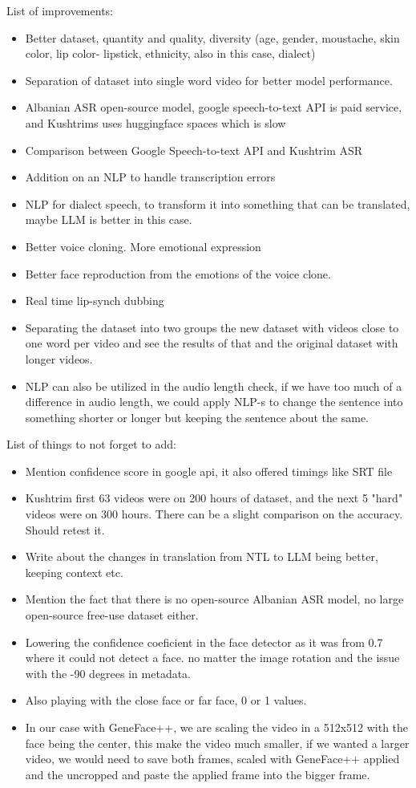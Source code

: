 \documentclass[12pt]{article}
\begin{document}
List of improvements:
\begin{itemize}
    \item Better dataset, quantity and quality, diversity (age, gender, moustache, skin color, lip color- lipstick, ethnicity, also in this case, dialect)
    \item Separation of dataset into single word video for better model performance.
    \item Albanian ASR open-source model, google speech-to-text API is paid service, and Kushtrims uses huggingface spaces which is slow
    \item Comparison between Google Speech-to-text API and Kushtrim ASR
    \item Addition on an NLP to handle transcription errors
    \item NLP for dialect speech, to transform it into something that can be translated, maybe LLM is better in this case.
    \item Better voice cloning. More emotional expression
    \item Better face reproduction from the emotions of the voice clone.
    \item Real time lip-synch dubbing
    \item Separating the dataset into two groups the new dataset with videos close to one word per video and see the results of that and the original dataset with longer videos. 
    \item NLP can also be utilized in the audio length check, if we have too much of a difference in audio length, we could apply NLP-s to change the sentence into something shorter or longer but keeping the sentence about the same.
\end{itemize}

List of things to not forget to add:
\begin{itemize}
    \item Mention confidence score in google api, it also offered timings like SRT file
    \item Kushtrim first 63 videos were on 200 hours of dataset, and the next 5 "hard" videos were on 300 hours. There can be a slight comparison on the accuracy. Should retest it.
    \item Write about the changes in translation from NTL to LLM being better, keeping context etc.
    \item Mention the fact that there is no open-source Albanian ASR model, no large open-source free-use dataset either. 
    \item Lowering the confidence coeficient in the face detector as it was from 0.7 where it could not detect a face. no matter the image rotation and the issue with the -90 degrees in metadata. 
    \item Also playing with the close face or far face, 0 or 1 values.
    \item In our case with GeneFace++, we are scaling the video in a 512x512 with the face being the center, this make the video much smaller, if we wanted a larger video, we would need to save both frames, scaled with GeneFace++ applied and the uncropped and paste the applied frame into the bigger frame.
\end{itemize}



\end{document}
